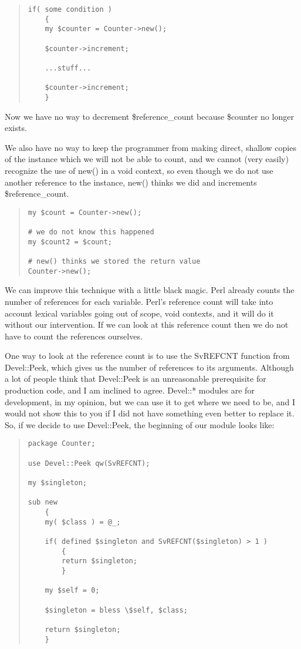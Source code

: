 \begin{quote}    
\begin{verbatim}
if( some condition )
    {
    my $counter = Counter->new();
    
    $counter->increment;
    
    ...stuff... 

    $counter->increment;
    }
\end{verbatim}
\end{quote}    
        
Now we have no way to decrement \$reference\_count because \$counter
no longer exists.

We also have no way to keep the programmer from making direct,
shallow copies of the instance which we will not be able to count,
and we cannot (very easily) recognize the use of new() in a
void context, so even though we do not use another reference to
the instance, new() thinks we did and increments \$reference\_count.

\begin{quote}    
\begin{verbatim}
my $count = Counter->new();

# we do not know this happened
my $count2 = $count;

# new() thinks we stored the return value
Counter->new();
\end{verbatim}
\end{quote}    

We can improve this technique with a little black magic.
Perl already counts the number of references for each
variable.  Perl's reference count will take into account
lexical variables going out of scope, void contexts, and it
will do it without our intervention.  If we can look at this
reference count then we do not have to count the references
ourselves.

One way to look at the reference count is to use the
SvREFCNT function from Devel::Peek, which gives us the
number of references to its arguments.  Although a lot of
people think that Devel::Peek is an unreasonable
prerequisite for production code, and I am inclined to
agree.  Devel::* modules are for development, in my opinion,
but we can use it to get where we need to be, and I would
not show this to you if I did not have something even better
to replace it. So, if we decide to use Devel::Peek, the
beginning of our module looks like:

\begin{quote}    
\begin{verbatim}
package Counter;

use Devel::Peek qw(SvREFCNT);

my $singleton;

sub new
    {
    my( $class ) = @_;

    if( defined $singleton and SvREFCNT($singleton) > 1 )
        {
        return $singleton;
        }

    my $self = 0;

    $singleton = bless \$self, $class;

    return $singleton;
    }
\end{verbatim}
\end{quote}    

